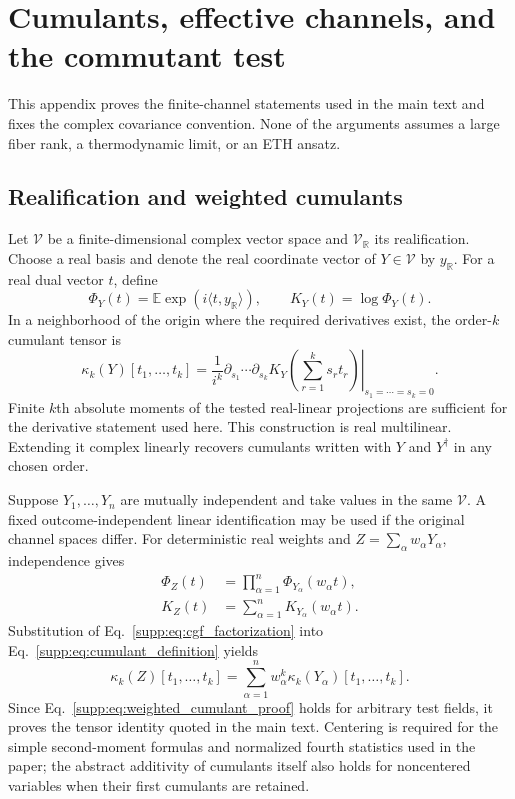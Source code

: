 \section{Cumulants, effective channels, and the commutant test}
\label{supp:channel_theorem}

This appendix proves the finite-channel statements used in the main text and
fixes the complex covariance convention.  None of the arguments assumes a
large fiber rank, a thermodynamic limit, or an ETH ansatz.

\subsection{Realification and weighted cumulants}

Let $\mathcal V$ be a finite-dimensional complex vector space and
$\mathcal V_{\mathbb R}$ its realification.  Choose a real basis and denote
the real coordinate vector of $Y\in\mathcal V$ by $y_{\mathbb R}$.  For a
real dual vector $t$, define
\begin{equation}
 \Phi_Y(t)=\mathbb E\exp\!\left(i\langle t,y_{\mathbb R}\rangle\right),
 \qquad
 K_Y(t)=\log\Phi_Y(t).
 \label{supp:eq:cumulant_generator}
\end{equation}
In a neighborhood of the origin where the required derivatives exist, the
order-$k$ cumulant tensor is
\begin{equation}
 \kappa_k(Y)[t_1,\ldots,t_k]
 =\left.\frac{1}{i^k}
 \partial_{s_1}\cdots\partial_{s_k}
 K_Y\!\left(\sum_{r=1}^{k}s_rt_r\right)
 \right|_{s_1=\cdots=s_k=0} .
 \label{supp:eq:cumulant_definition}
\end{equation}
Finite $k$th absolute moments of the tested real-linear projections are
sufficient for the derivative statement used here.  This construction is
real multilinear.  Extending it complex linearly recovers cumulants written
with $Y$ and $Y^\dagger$ in any chosen order.

Suppose $Y_1,\ldots,Y_n$ are mutually independent and take values in the same
$\mathcal V$.  A fixed outcome-independent linear identification may be used
if the original channel spaces differ.  For deterministic real weights and
$Z=\sum_\alpha w_\alpha Y_\alpha$, independence gives
\begin{align}
 \Phi_Z(t)
 &=\prod_{\alpha=1}^{n}\Phi_{Y_\alpha}(w_\alpha t),\nonumber\\
 K_Z(t)
 &=\sum_{\alpha=1}^{n}K_{Y_\alpha}(w_\alpha t).
 \label{supp:eq:cgf_factorization}
\end{align}
Substitution of Eq.~\eqref{supp:eq:cgf_factorization} into
Eq.~\eqref{supp:eq:cumulant_definition} yields
\begin{equation}
 \kappa_k(Z)[t_1,\ldots,t_k]
 =\sum_{\alpha=1}^{n}w_\alpha^k
 \kappa_k(Y_\alpha)[t_1,\ldots,t_k].
 \label{supp:eq:weighted_cumulant_proof}
\end{equation}
Since Eq.~\eqref{supp:eq:weighted_cumulant_proof} holds for arbitrary test
fields, it proves the tensor identity quoted in the main text.  Centering is
required for the simple
second-moment formulas and normalized fourth statistics used in the paper;
the abstract additivity of cumulants itself also holds for noncentered
variables when their first cumulants are retained.

